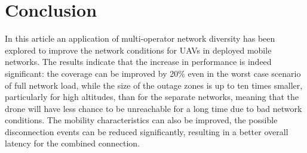 \documentclass[conference,twocolumn,a4paper]{IEEEtran}
\begin{document}
\section{Conclusion}
\par In this article an application of multi-operator network diversity has been explored to improve the network conditions for UAVs in deployed mobile networks. The results indicate that the increase in performance is indeed significant: the coverage can be improved by 20\% even in the worst case scenario of full network load, while the size of the outage zones is up to ten times smaller, particularly for high altitudes, than for the separate networks, meaning that the drone will have less chance to be unreachable for a long time due to bad network conditions.
The mobility characteristics can also be improved, the possible disconnection events can be reduced significantly, resulting in
a better overall latency for the combined connection. %



\end{document}
